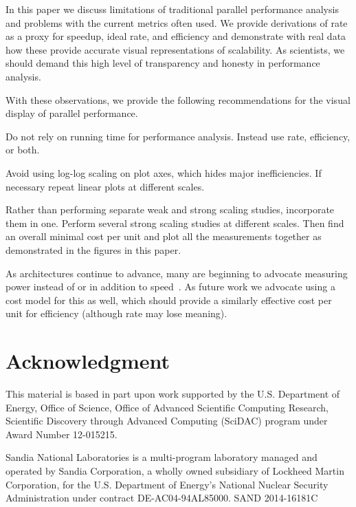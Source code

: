 \documentclass[conference]{IEEEtran}
\newcommand*{\lcite}[1]{~\cite{#1}}
\newcommand{\fix}[1]{}
\newenvironment{packed_itemize}{
  \begin{itemize}[noitemsep]
}{
  \end{itemize}
}
\begin{document}
\noindent
In this paper we discuss limitations of traditional parallel performance
analysis and problems with the current metrics often used. We provide
derivations of rate as a proxy for speedup, ideal rate, and efficiency and
demonstrate with real data how these provide accurate visual
representations of scalability. As scientists, we should demand this high
level of transparency and honesty in performance analysis.

With these observations, we provide the following recommendations for the
visual display of parallel performance.
\begin{packed_itemize}
\item Do not rely on running time for performance analysis. Instead use
  rate, efficiency, or both.
\item Avoid using log-log scaling on plot axes, which hides major
  inefficiencies. If necessary repeat linear plots at different scales.
\item Rather than performing separate weak and strong scaling studies,
  incorporate them in one. Perform several strong scaling studies at
  different scales. Then find an overall minimal cost per unit and plot all
  the measurements together as demonstrated in the figures in this paper.
\end{packed_itemize}

As architectures continue to advance, many are beginning to advocate
measuring power instead of or in addition to speed\lcite{Cameron2012}. As
future work we advocate using a cost model for this as well, which should
provide a similarly effective cost per unit for efficiency (although rate
may lose meaning). \fix{Is this paragraph off topic?}


\section*{Acknowledgment}

\noindent
This material is based in part upon work supported by the U.S. Department
of Energy, Office of Science, Office of Advanced Scientific Computing
Research, Scientific Discovery through Advanced Computing (SciDAC) program
under Award Number 12-015215.

Sandia National Laboratories is a multi-program laboratory managed and
operated by Sandia Corporation, a wholly owned subsidiary of Lockheed
Martin Corporation, for the U.S. Department of Energy's National Nuclear
Security Administration under contract DE-AC04-94AL85000. \hfill
{\footnotesize SAND 2014-16181C}



\end{document}
